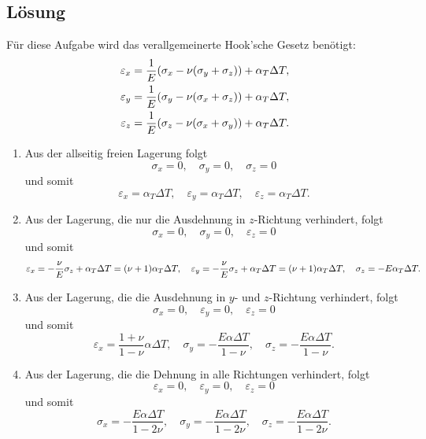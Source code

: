 \documentclass{exercise}
\begin{document}
    \subsection*{Lösung}
    Für diese Aufgabe wird das verallgemeinerte Hook'sche Gesetz benötigt:
    \begin{align*}
        \varepsilon_x &= \frac{1}{E}\parentheses*{\sigma_x - \nu\parentheses*{\sigma_y + \sigma_z}} + \alpha_T \Delta T,\\
        \varepsilon_y &= \frac{1}{E}\parentheses*{\sigma_y - \nu\parentheses*{\sigma_x + \sigma_z}} + \alpha_T \Delta T,\\
        \varepsilon_z &= \frac{1}{E}\parentheses*{\sigma_z - \nu\parentheses*{\sigma_x + \sigma_y}} + \alpha_T \Delta T.
    \end{align*}
    \begin{enumerate}
        \item Aus der allseitig freien Lagerung folgt
        \[
            \sigma_x = 0, \quad \sigma_y = 0, \quad \sigma_z = 0
        \]
        und somit
        \[
            \varepsilon_x = \alpha_T \Delta T, \quad \varepsilon_y = \alpha_T \Delta T, \quad \varepsilon_z = \alpha_T \Delta T.
        \]
        \item Aus der Lagerung, die nur die Ausdehnung in \(z\)-Richtung verhindert, folgt
        \[
            \sigma_x = 0, \quad \sigma_y = 0, \quad \varepsilon_z = 0
        \]
        und somit
        \[
            \varepsilon_x = -\frac{\nu}{E}\sigma_z + \alpha_T \Delta T = \parentheses*{\nu + 1}\alpha_T \Delta T, \quad \varepsilon_y = -\frac{\nu}{E}\sigma_z + \alpha_T \Delta T = \parentheses*{\nu + 1}\alpha_T \Delta T, \quad \sigma_z = -E\alpha_T \Delta T.
        \]
        \item Aus der Lagerung, die die Ausdehnung in \(y\)- und \(z\)-Richtung verhindert, folgt
        \[
            \sigma_x = 0, \quad \varepsilon_y = 0, \quad \varepsilon_z = 0
        \]
        und somit
        \[
            \varepsilon_x = \frac{1 + \nu}{1 - \nu}\alpha\Delta T, \quad \sigma_y = -\frac{E\alpha\Delta T}{1 - \nu}, \quad \sigma_z = -\frac{E\alpha\Delta T}{1 - \nu}.
        \]
        \item Aus der Lagerung, die die Dehnung in alle Richtungen verhindert, folgt
        \[
            \varepsilon_x = 0, \quad \varepsilon_y = 0, \quad \varepsilon_z = 0
        \]
        und somit
        \[
            \sigma_x = -\frac{E\alpha\Delta T}{1 - 2\nu}, \quad \sigma_y = -\frac{E\alpha\Delta T}{1 - 2\nu}, \quad \sigma_z = -\frac{E\alpha\Delta T}{1 - 2\nu}.
        \]
    \end{enumerate}
\end{document}
